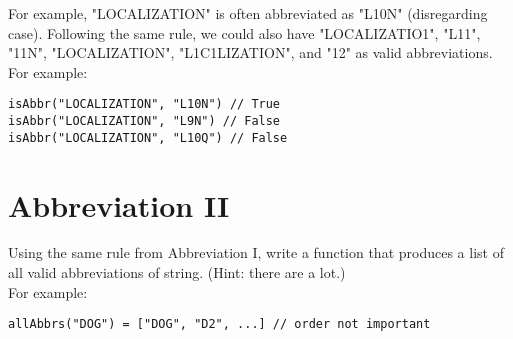 \documentclass[12pt,runningheads]{article}
\begin{document}
For example, "LOCALIZATION" is often abbreviated as "L10N" (disregarding case). Following the same rule, we could also have "LOCALIZATIO1", "L11", "11N", "LOCALIZATION", "L1C1LIZATION", and "12" as valid abbreviations.\\

For example:

\begin{verbatim}
isAbbr("LOCALIZATION", "L10N") // True
isAbbr("LOCALIZATION", "L9N") // False
isAbbr("LOCALIZATION", "L10Q") // False
\end{verbatim}

\begin{comment}
def isAbbr(orig, test):
    i = 0
    while i != len(orig):
        if orig[i] == test[i]: # TODO: fix indexing error
            i += 1
        elif test[i].isdigit():
            # do stuff
            num_start = i
            num_end = i + 1
            while num_end < len(test) and test[num_end].isdigit():
                num_end += 1
            numeric_slice = test[num_start:num_end]
            num = int(numeric_slice)
            i += num
        else:
            return False
    return True

def takeWhile(pred, lst):
    res = []
    for elem in lst:
        if pred(elem):
            res.append(elem)
        else:
            break
    return res

def isAbbrRec(orig, test):
    if not orig and not test:
        return True
    elif (not orig) != (not test):
        return False
    elif orig[0] == test[0]:
        return isAbbrRec(orig[1:], test[1:])
    elif orig[0] != test[0] and test[0].isdigit():
        numeric_prefix = takeWhile(lambda c: c.isdigit(), test)
        num = int(''.join(numeric_prefix))
        return isAbbrRec(orig[num:], test[1:])
    else:
        return False
\end{comment}

\newpage

\section{Abbreviation II}

Using the same rule from Abbreviation I, write a function that produces a list of all valid abbreviations of string. (Hint: there are a lot.)\\

For example:

\begin{verbatim}
allAbbrs("DOG") = ["DOG", "D2", ...] // order not important
\end{verbatim}
\end{document}
